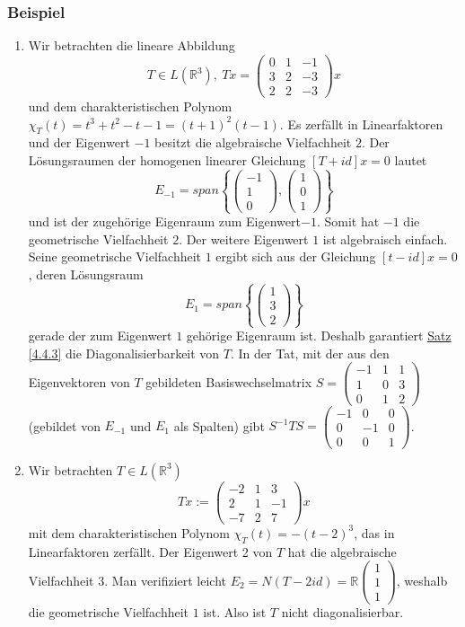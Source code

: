 \subsubsection{Beispiel}
\label{4.4.4}
\numbers
\begin{enumerate}
\item Wir betrachten die lineare Abbildung 
\[T\in L(\mathbb{R}^3),\ Tx=\begin{pmatrix}0 & 1 & -1\\ 3 & 2 & -3 \\ 2 & 2 & -3\end{pmatrix}x\]
und dem charakteristischen Polynom $\chi _T(t)=t^3+t^2-t-1=(t+1)^2(t-1)$.  Es zerfällt in Linearfaktoren und der Eigenwert $-1$ besitzt die algebraische Vielfachheit $2$.  Der Lösungsraumen der homogenen linearer Gleichung $[T+id]x=0$ lautet
\[E_{-1}=span\left\{\begin{pmatrix}-1\\ 1\\ 0\end{pmatrix},\begin{pmatrix}1\\ 0\\ 1\end{pmatrix}\right\}\]
und ist der zugehörige Eigenraum zum Eigenwert$-1$.  Somit hat $-1$ die geometrische Vielfachheit $2$.  Der weitere Eigenwert $1$ ist algebraisch einfach.  Seine geometrische Vielfachheit $1$ ergibt sich aus der Gleichung $[t-id]x=0$, deren Lösungsraum
\[E_1=span\left\{\begin{pmatrix}1\\ 3\\ 2\end{pmatrix}\right\}\]
gerade der zum Eigenwert $1$ gehörige Eigenraum ist.  Deshalb garantiert \hyperref[4.4.3]{Satz \ref{4.4.3}} die Diagonalisierbarkeit von $T$.  In der Tat, mit der aus den Eigenvektoren von $T$ gebildeten Basiswechselmatrix $S=\begin{pmatrix}-1 & 1 & 1\\ 1 & 0 & 3 \\ 0 & 1 & 2\end{pmatrix}$ (gebildet von $E_{-1}$ und $E_1$ als Spalten) gibt $S^{-1}TS=\begin{pmatrix}-1 & 0 & 0 \\0 & -1 & 0\\ 0 & 0 & 1\end{pmatrix}$.
\item Wir betrachten $T\in L(\mathbb{R}^3)$
\[Tx:=\begin{pmatrix}-2 & 1 & 3\\ 2 & 1 & -1\\ -7 & 2 & 7\end{pmatrix}x\]
mit dem charakteristischen Polynom $\chi _T(t)=-(t-2)^3$, das in Linearfaktoren zerfällt.  Der Eigenwert 2 von $T$ hat die algebraische Vielfachheit $3$.  Man verifiziert leicht $E_2=N(T-2id)=\mathbb{R}\begin{pmatrix}1\\ 1\\ 1\end{pmatrix}$,
weshalb die geometrische Vielfachheit $1$ ist.  Also ist $T$ nicht diagonalisierbar.
\end{enumerate}
